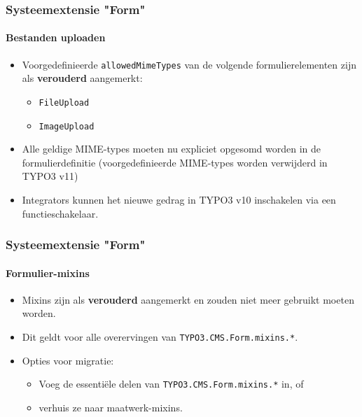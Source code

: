 
\begin{frame}[fragile]
	\frametitle{Systeemextensie "Form"}
	\framesubtitle{Bestanden uploaden}

	\begin{itemize}
		\item Voorgedefinieerde \texttt{allowedMimeTypes} van de volgende formulierelementen zijn als \textbf{verouderd} aangemerkt:

			\begin{itemize}
				\item \texttt{FileUpload}
				\item \texttt{ImageUpload}
			\end{itemize}

		\item Alle geldige MIME-types moeten nu expliciet opgesomd worden in de formulierdefinitie\newline
			\smaller
				(voorgedefinieerde MIME-types worden verwijderd in TYPO3 v11)
			\normalsize

		\item Integrators kunnen het nieuwe gedrag in TYPO3 v10 inschakelen via een functieschakelaar.

	\end{itemize}

\end{frame}


\begin{frame}[fragile]
	\frametitle{Systeemextensie "Form"}
	\framesubtitle{Formulier-mixins}

	\begin{itemize}
		\item Mixins zijn als \textbf{verouderd} aangemerkt en zouden niet meer gebruikt moeten worden.
		\item Dit geldt voor alle overervingen van \texttt{TYPO3.CMS.Form.mixins.*}.
		\item Opties voor migratie:

			\begin{itemize}
				\item Voeg de essenti\"ele delen van \texttt{TYPO3.CMS.Form.mixins.*} in, of
				\item verhuis ze naar maatwerk-mixins.
			\end{itemize}

	\end{itemize}

\end{frame}


